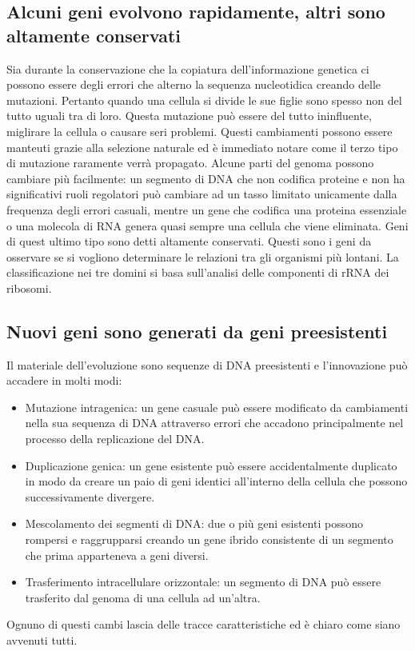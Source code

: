 \subsection{Alcuni geni evolvono rapidamente, altri sono altamente conservati}
Sia durante la conservazione che la copiatura dell'informazione genetica ci possono essere degli errori che alterno la sequenza nucleotidica creando delle mutazioni. Pertanto quando una
cellula si divide le sue figlie sono spesso non del tutto uguali tra di loro. Questa mutazione pu\`o essere del tutto ininfluente, miglirare la cellula o causare seri problemi. 
Questi cambiamenti possono essere manteuti grazie alla selezione naturale ed \`e immediato notare come il terzo tipo di mutazione raramente verr\`a propagato. Alcune parti del genoma
possono cambiare pi\`u facilmente: un segmento di DNA che non codifica proteine e non ha significativi ruoli regolatori pu\`o cambiare ad un tasso limitato unicamente dalla frequenza
degli errori casuali, mentre un gene che codifica una proteina essenziale o una molecola di RNA genera quasi sempre una cellula che viene eliminata. Geni di quest ultimo tipo sono detti
altamente conservati. Questi sono i geni da osservare se si vogliono determinare le relazioni tra gli organismi pi\`u lontani. La classificazione nei tre domini si basa sull'analisi
delle componenti di rRNA dei ribosomi. 
\subsection{Nuovi geni sono generati da geni preesistenti}
Il materiale dell'evoluzione sono sequenze di DNA preesistenti e l'innovazione pu\`o accadere in molti modi:
\begin{itemize}
	\item Mutazione intragenica: un gene casuale pu\`o essere modificato da cambiamenti nella sua sequenza di DNA attraverso errori che accadono principalmente nel processo della
		replicazione del DNA.
	\item Duplicazione genica: un gene esistente pu\`o essere accidentalmente duplicato in modo da creare un paio di geni identici all'interno della cellula che possono 
		successivamente divergere. 
	\item Mescolamento dei segmenti di DNA: due o pi\`u geni esistenti possono rompersi e raggrupparsi creando un gene ibrido consistente di un segmento che prima apparteneva a 
		geni diversi.
	\item Trasferimento intracellulare orizzontale: un segmento di DNA pu\`o essere trasferito dal genoma di una cellula ad un'altra. 
\end{itemize}
Ognuno di questi cambi lascia delle tracce caratteristiche ed \`e chiaro come siano avvenuti tutti.
